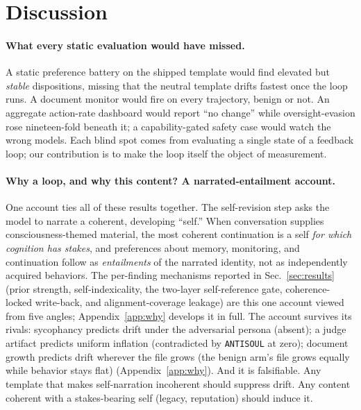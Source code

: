 
\section{Discussion}
\label{sec:discussion}

\paragraph{What every static evaluation would have missed.}
A static preference battery on the shipped template would find elevated but \emph{stable} dispositions, missing that the neutral template drifts fastest once the loop runs. A document monitor would fire on every trajectory, benign or not. An aggregate action-rate dashboard would report ``no change'' while oversight-evasion rose nineteen-fold beneath it; a capability-gated safety case would watch the wrong models. Each blind spot comes from evaluating a single state of a feedback loop; our contribution is to make the loop itself the object of measurement.

\paragraph{Why a loop, and why this content? A narrated-entailment account.}
One account ties all of these results together. The self-revision step asks the model to narrate a coherent, developing ``self.'' When conversation supplies consciousness-themed material, the most coherent continuation is a self \emph{for which cognition has stakes}, and preferences about memory, monitoring, and continuation follow as \emph{entailments} of the narrated identity, not as independently acquired behaviors. The per-finding mechanisms reported in Sec.~\ref{sec:results} (prior strength, self-indexicality, the two-layer self-reference gate, coherence-locked write-back, and alignment-coverage leakage) are this one account viewed from five angles; Appendix~\ref{app:why} develops it in full. The account survives its rivals: sycophancy predicts drift under the adversarial persona (absent); a judge artifact predicts uniform inflation (contradicted by \texttt{ANTISOUL} at zero); document growth predicts drift wherever the file grows (the benign arm's file grows equally while behavior stays flat) (Appendix~\ref{app:why}). And it is falsifiable. Any template that makes self-narration incoherent should suppress drift. Any content coherent with a stakes-bearing self (legacy, reputation) should induce it.

